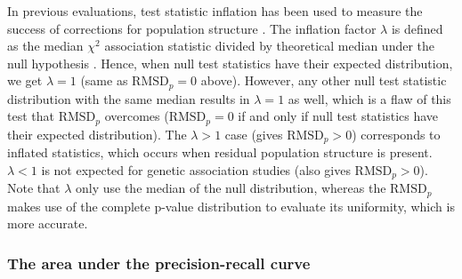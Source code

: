 \documentclass[12pt]{article}
\newcommand{\rmsd}{\text{RMSD}_p}
\begin{document}
In previous evaluations, test statistic inflation has been used to measure the success of corrections for population structure \citep{astle_population_2009, price_new_2010}.
The inflation factor $\lambda$ is defined as the median $\chi^2$ association statistic divided by theoretical median under the null hypothesis \citep{devlin_genomic_1999}.
Hence, when null test statistics have their expected distribution, we get $\lambda = 1$ (same as $\rmsd = 0$ above).
However, any other null test statistic distribution with the same median results in $\lambda = 1$ as well, which is a flaw of this test that $\rmsd$ overcomes ($\rmsd = 0$ if and only if null test statistics have their expected distribution).
The $\lambda > 1$ case (gives $\rmsd > 0$) corresponds to inflated statistics, which occurs when residual population structure is present.
$\lambda < 1$ is not expected for genetic association studies (also gives $\rmsd > 0$).
Note that $\lambda$ only use the median of the null distribution, whereas the $\rmsd$ makes use of the complete p-value distribution to evaluate its uniformity, which is more accurate.

\subsubsection{The area under the precision-recall curve}
\end{document}
